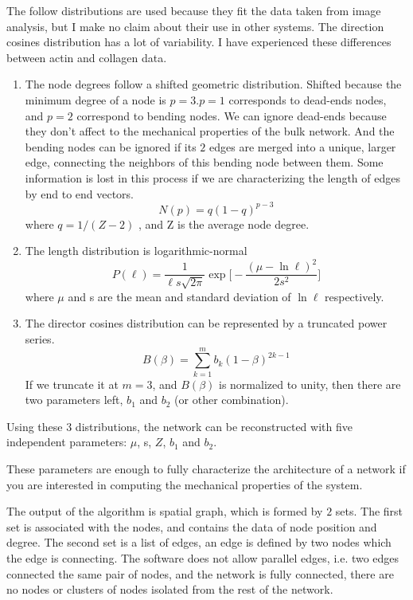 The follow distributions are used because they fit the data taken from image
analysis, but I make no claim about their use in other systems. The
direction cosines distribution has a lot of variability. I have experienced
these differences between actin and collagen data.
\begin{enumerate} 
\item The node degrees follow a shifted geometric distribution. Shifted because
the minimum degree of a node is $p=3$.$p=1$ corresponds to dead-ends nodes, and
$p=2$ correspond to bending nodes. We can ignore dead-ends because they don't
affect to the mechanical properties of the bulk network. And the bending nodes
can be ignored if its $2$ edges are merged into a unique, larger edge,
connecting the neighbors of this bending node between them. Some information is lost in this
process if we are characterizing the length of edges by end to end
vectors.
\begin{equation} \label{degree-dist}
N(p)=q(1-q)^{p-3} 
\end{equation}
where $q=1/(Z-2)$ , and Z is the average node degree.
\item The length distribution is logarithmic-normal  
\begin{equation} \label{length-dist}
P(\ell)=\frac{1}{\ell
s\sqrt{2\pi}}\exp{\bigg[-\frac{(\mu-\ln{\ell})^2}{2s^2}\bigg]}
\end{equation}
where $\mu$ and s are the mean and standard deviation of $\ln{\ell}$
respectively.
\item The director cosines distribution can be represented by a truncated power
series.
\begin{equation} \label{cosines-dist}
B(\beta)=\sum_{k=1}^{m} b_k(1-\beta)^{2k-1}
\end{equation}
If we truncate it at $m=3$, and $B(\beta)$ is normalized to unity, then there
are two parameters left, $b_1$ and $b_2$ (or other combination).
\end{enumerate}

Using these $3$ distributions, the network can be reconstructed with five
independent parameters: $\mu$, s, $Z$, $b_1$ and $b_2$.

These parameters are enough to fully characterize the architecture of a
network if you are interested in computing the
mechanical properties of the system.

The output of the algorithm is spatial \gls{graph}, which is formed by $2$
sets. The first set is associated with the nodes, and contains the data of node
position and degree. The second set is a list of edges, an edge is defined
by two nodes which the edge is connecting. The software does not allow parallel
edges, i.e. two edges connected the same pair of nodes, and the network is fully
connected, there are no nodes or clusters of nodes isolated from the rest of the
network.
 
 
